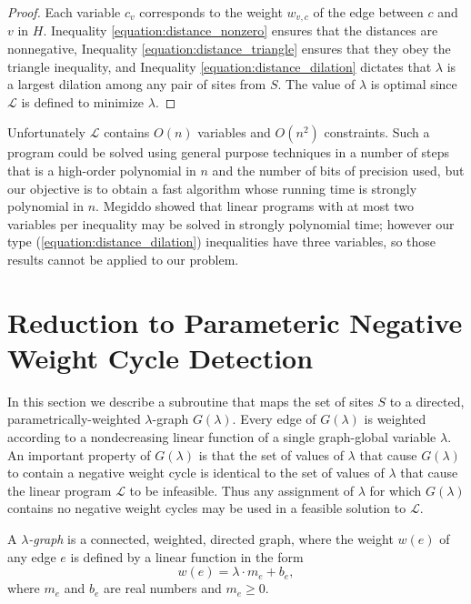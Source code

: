\documentclass{llncs}
\begin{document}
\begin{proof}
Each variable $c_v$ corresponds to the weight $w_{v,c}$ of the edge between $c$ and $v$ in $H$.  Inequality \ref{equation:distance_nonzero} ensures that the distances are nonnegative, Inequality
\ref{equation:distance_triangle} ensures that they obey the triangle inequality, and Inequality
\ref{equation:distance_dilation} dictates that $\lambda$ is a largest dilation among any pair of sites from $S$.  The value of $\lambda$ is optimal since $\mathcal{L}$ is defined to minimize $\lambda$.
\end{proof}

Unfortunately $\mathcal{L}$ contains $O(n)$ variables and $O(n^2)$ constraints.  Such a program could be solved using general purpose techniques in a number of steps that is a high-order polynomial in $n$ and the number of bits of precision used, but our objective is to obtain a fast algorithm whose running time is strongly polynomial in $n$.  Megiddo showed \cite{megiddo:347} that linear programs with at most two variables per inequality may be solved in strongly polynomial time; however our type (\ref{equation:distance_dilation}) inequalities have three variables, so those results cannot be applied to our problem.

\section{Reduction to Parameteric Negative Weight Cycle Detection}
\label{section:reduction}

In this section we describe a subroutine that maps the set of sites $S$ to a directed, parametrically-weighted $\lambda$-graph $G(\lambda)$.  Every edge of $G(\lambda)$ is weighted according to a nondecreasing linear function of a single graph-global variable $\lambda$.  An important property of $G(\lambda)$ is that the set of values of $\lambda$ that cause $G(\lambda)$ to contain a negative weight cycle is identical to the set of values of $\lambda$ that cause the linear program $\mathcal{L}$ to be infeasible.  Thus any assignment of $\lambda$ for which $G(\lambda)$ contains no negative weight cycles may be used in a feasible solution to $\mathcal{L}$.

\begin{definition}
\label{definition:lambda_graph}
A \emph{$\lambda$-graph} is a connected, weighted, directed graph, where the weight $w(e)$ of any edge $e$ is defined by a linear function in the form
\[ w(e) = \lambda \cdot m_e + b_e ,\]
\noindent where $m_e$ and $b_e$ are real numbers and $m_e \geq 0$.
\end{definition}
\end{document}
